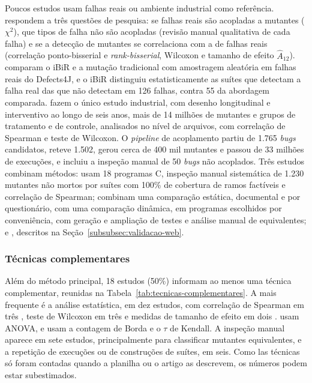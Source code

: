 Poucos estudos usam falhas reais ou ambiente industrial como referência.  respondem a três questões de pesquisa: se falhas reais são acopladas a mutantes ($\chi^2$), que tipos de falha não são acopladas (revisão manual qualitativa de cada falha) e se a detecção de mutantes se correlaciona com a de falhas reais (correlação ponto-bisserial e \textit{rank-bisserial}, Wilcoxon e tamanho de efeito $\hat{A}_{12}$).  comparam o iBiR e a mutação tradicional com amostragem aleatória em falhas reais do Defects4J, e o iBiR distinguiu estatisticamente as suítes que detectam a falha real das que não detectam em 126 falhas, contra 55 da abordagem comparada.  fazem o único estudo industrial, com desenho longitudinal e interventivo ao longo de seis anos, mais de 14 milhões de mutantes e grupos de tratamento e de controle, analisados no nível de arquivos, com correlação de Spearman e teste de Wilcoxon. O \textit{pipeline} de acoplamento partiu de 1.765 \textit{bugs} candidatos, reteve 1.502, gerou cerca de 400 mil mutantes e passou de 33 milhões de execuções, e incluiu a inspeção manual de 50 \textit{bugs} não acoplados. Três estudos combinam métodos:  usam 18 programas C, inspeção manual sistemática de 1.230 mutantes não mortos por suítes com 100\% de cobertura de ramos factíveis e correlação de Spearman;  combinam uma comparação estática, documental e por questionário, com uma comparação dinâmica, em programas escolhidos por conveniência, com geração e ampliação de testes e análise manual de equivalentes; e , descritos na Seção~\ref{subsubsec:validacao-web}.

\subsubsection{Técnicas complementares}
\label{subsubsec:tecnicas-complementares}

Além do método principal, 18 estudos (50\%) informam ao menos uma técnica complementar, reunidas na Tabela~\ref{tab:tecnicas-complementares}. A mais frequente é a análise estatística, em dez estudos, com correlação de Spearman em três \cite{yao2014, kurtz2016, petrovic2021}, teste de Wilcoxon em três \cite{just2014, grano2019, petrovic2021} e medidas de tamanho de efeito em dois \cite{just2014, grano2019}.  usam ANOVA, e  usam a contagem de Borda e o $\tau$ de Kendall. A inspeção manual aparece em sete estudos, principalmente para classificar mutantes equivalentes, e a repetição de execuções ou de construções de suítes, em seis. Como las técnicas só foram contadas quando a planilha ou o artigo as descrevem, os números podem estar subestimados.

